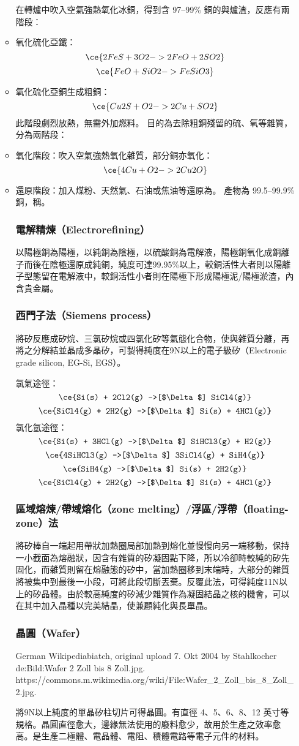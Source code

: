 \documentclass[a4paper,12pt]{report}
\begin{document}
\begin{itemize}
\begin{itemize}
在轉爐中吹入空氣強熱氧化冰銅，得到含 97–99\% 銅的與爐渣，反應有兩階段：
\ben
\item 氧化硫化亞鐵：
\[\ce{2FeS + 3O2 -> 2FeO + 2SO2}\]
\[\ce{FeO + SiO2 -> FeSiO3}\]
\item 氧化硫化亞銅生成粗銅：  
\[\ce{Cu2S + O2 -> 2Cu + SO2}\]
此階段劇烈放熱，無需外加燃料。
\een
{}
目的為去除粗銅殘留的硫、氧等雜質，分為兩階段：
\ben
\item 氧化階段：吹入空氣強熱氧化雜質，部分銅亦氧化：
\[\ce{4Cu + O2 -> 2Cu2O}\]
\item 還原階段：加入煤粉、天然氣、石油或焦油等還原為。
\een
產物為 99.5–99.9\% 銅，稱。
\subsubsection{電解精煉（Electrorefining）}
以陽極銅為陽極，以純銅為陰極，以硫酸銅為電解液，陽極銅氧化成銅離子而後在陰極還原成純銅，純度可達99.95\%以上，較銅活性大者則以陽離子型態留在電解液中，較銅活性小者則在陽極下形成陽極泥/陽極淤渣，內含貴金屬。
\subsubsection{西門子法（Siemens process）}
將矽反應成矽烷、三氯矽烷或四氯化矽等氣態化合物，使與雜質分離，再將之分解結並晶成多晶矽，可製得純度在9N以上的電子級矽（Electronic grade silicon, EG-Si, EGS）。

氯氣途徑：
\[\ce{Si(s) + 2Cl2(g) ->[$\Delta$] SiCl4(g)}\]
\[\ce{SiCl4(g) + 2H2(g) ->[$\Delta$] Si(s) + 4HCl(g)}\]
氯化氫途徑：
\[\ce{Si(s) + 3HCl(g) ->[$\Delta$] SiHCl3(g) + H2(g)}\]
\[\ce{4SiHCl3(g) ->[$\Delta$] 3SiCl4(g) + SiH4(g)}\]
\[\ce{SiH4(g) ->[$\Delta$] Si(s) + 2H2(g)}\]
\[\ce{SiCl4(g) + 2H2(g) ->[$\Delta$] Si(s) + 4HCl(g)}\]
\subsubsection{區域熔煉/帶域熔化（zone melting）/浮區/浮帶（floating-zone）法}
將矽棒自一端起用帶狀加熱圈局部加熱到熔化並慢慢向另一端移動，保持一小截面為熔融狀，因含有雜質的矽凝固點下降，所以冷卻時較純的矽先固化，而雜質則留在熔融態的矽中，當加熱圈移到末端時，大部分的雜質將被集中到最後一小段，可將此段切斷丟棄。反覆此法，可得純度11N以上的矽晶體。由於較高純度的矽減少雜質作為凝固結晶之核的機會，可以在其中加入晶種以完美結晶，使兼顧純化與長單晶。
\subsubsection{晶圓（Wafer）}
\bct\bfH\ctr{}\caption{German Wikipediabiatch, original upload 7. Okt 2004 by Stahlkocher de:Bild:Wafer 2 Zoll bis 8 Zoll.jpg. https://commons.m.wikimedia.org/wiki/File:Wafer\_2\_Zoll\_bis\_8\_Zoll\_2.jpg.}\ef\FB\ect
將9N以上純度的單晶矽柱切片可得晶圓。有直徑 4、5、6、8、12 英寸等規格。晶圓直徑愈大，邊緣無法使用的廢料愈少，故用於生產之效率愈高。是生產二極體、電晶體、電阻、積體電路等電子元件的材料。

\end{itemize}
\end{itemize}
\end{document}
